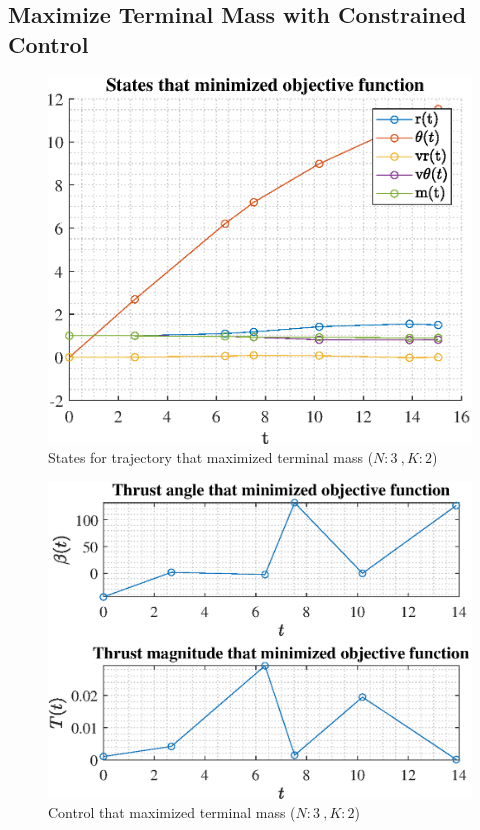 \documentclass[]{article}
\begin{document}
	\subsection{Maximize Terminal Mass with Constrained Control}
\begin{figure}
	\centering
	\includegraphics[scale=0.75]{states_N3_K2_C3_mf.eps}
	\caption{States for trajectory that maximized terminal mass (\(N:3\ , K:2\))}
	\label{fig:states_N3_K2_C3_mf}
\end{figure}
\begin{figure}
	\centering
	\includegraphics[scale=0.75]{control_N3_K2_C3_mf.eps}
	\caption{Control that maximized terminal mass (\(N:3\ , K:2\))}
	\label{fig:control_N3_K2_C3_mf}
\end{figure}
\end{document}
